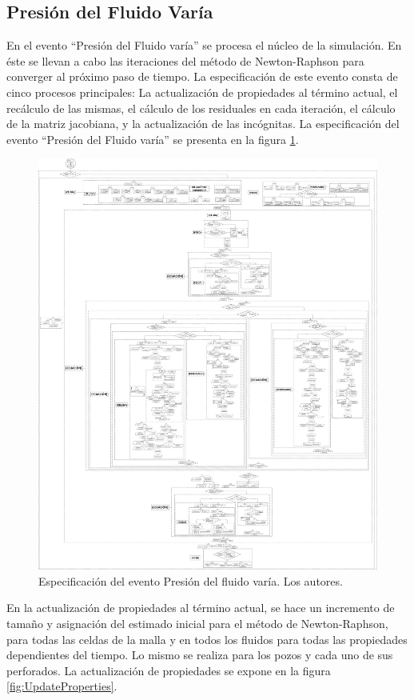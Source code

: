 \subsection{Presión del Fluido Varía}
En el evento ``Presión del Fluido varía'' se procesa el núcleo de la simulación. En éste se llevan a cabo las iteraciones del método de Newton-Raphson para converger al próximo paso de tiempo. La especificación de este evento consta de cinco procesos principales: La actualización de propiedades al término actual, el recálculo de las mismas, el cálculo de los residuales en cada iteración, el cálculo de la matriz jacobiana, y la actualización de las incógnitas. La especificación del evento ``Presión del Fluido varía'' se presenta en la figura \ref{fig:FluidPressureVaries}.\\

\begin{figure}[b]
	\centering%
	\includegraphics[width=0.9\linewidth]{Fig/PresionVaria.pdf}%
	\caption{Especificación del evento Presión del fluido varía. Los autores.} \label{fig:FluidPressureVaries}
\end{figure}

En la actualización de propiedades al término actual, se hace un incremento de tamaño y asignación del estimado inicial para el método de Newton-Raphson, para todas las celdas de la malla y en todos los fluidos para todas las propiedades dependientes del tiempo. Lo mismo se realiza para los pozos y cada uno de sus perforados. La actualización de propiedades se expone en la figura \ref{fig:UpdateProperties}. 

